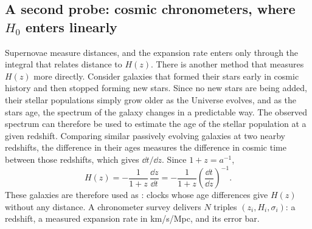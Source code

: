 \subsection{A second probe: cosmic chronometers, where \texorpdfstring{$H_0$}{H0} enters linearly}
\label{3b:sec:hubble-cc}

Supernovae measure distances, and the expansion rate enters only through the integral that
relates distance to $H(z)$. There is another method that measures $H(z)$ more directly.
Consider galaxies that formed their stars early in cosmic history and then stopped forming new
stars. Since no new stars are being added, their stellar populations simply grow older as the
Universe evolves, and as the stars age, the spectrum of the galaxy changes in a predictable
way. The observed spectrum can therefore be used to estimate the age of the stellar population
at a given redshift. Comparing similar passively evolving galaxies at two nearby redshifts, the
difference in their ages measures the difference in cosmic time between those redshifts, which
gives $\dd t/\dd z$. Since $1+z=a^{-1}$,
\begin{equation}
  H(z)=-\frac{1}{1+z}\,\frac{\dd z}{\dd t}=-\frac{1}{1+z}\left(\frac{\dd t}{\dd z}\right)^{-1}.
  \label{3b:eq:cc-hz}
\end{equation}
These galaxies are therefore used as : clocks whose age
differences give $H(z)$ without any distance.
A chronometer survey delivers $N$ triples $(z_i,H_i,\sigma_i)$: a redshift,
a measured expansion rate in km/s/Mpc, and its error bar.


